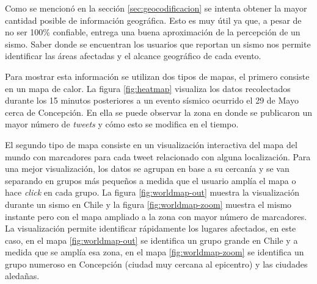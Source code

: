 	  	
	Como se mencionó en la sección \ref{sec:geocodificacion} se intenta obtener la mayor cantidad posible de información geográfica. 
	Esto es muy útil ya que, a pesar de no ser 100\% confiable, entrega una buena aproximación de la percepción de un sismo. 
	Saber donde se encuentran los usuarios que reportan un sismo nos permite identificar las áreas afectadas y el alcance geográfico de cada evento. 

	
	Para mostrar esta información se utilizan dos tipos de mapas, el primero consiste en un mapa de calor. 
	La figura \ref{fig:heatmap} visualiza los datos recolectados durante los 15 minutos posteriores a un evento sísmico ocurrido el 29 de Mayo cerca de Concepción. 
	En ella se puede observar la zona en donde se publicaron un mayor número de \textit{tweets} y cómo esto se modifica en el tiempo.
	
	
	El segundo tipo de mapa consiste en un visualización interactiva del mapa del mundo con marcadores para cada tweet relacionado con alguna localización.
	Para una mejor visualización, los datos se agrupan en base a su cercanía y se van separando en grupos más pequeños a medida que el usuario amplía el mapa o hace \textit{click} en cada grupo. 
	La figura \ref{fig:worldmap-out} muestra la visualización durante un sismo en Chile y la figura \ref{fig:worldmap-zoom} muestra el mismo instante pero con el mapa ampliado a la zona con mayor número de marcadores.
	La visualización permite identificar rápidamente los lugares afectados, en este caso, en el mapa \ref{fig:worldmap-out} se identifica un grupo grande en Chile y a medida que se amplía esa zona, en el mapa \ref{fig:worldmap-zoom} se identifica un grupo numeroso en Concepción (ciudad muy cercana al epicentro) y las ciudades aledañas.
	
